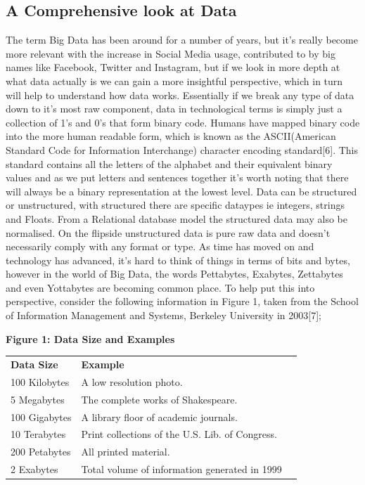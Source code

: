 \documentclass[10pt,journal,compsoc]{IEEEtran}
\begin{document}
\subsection{A Comprehensive look at Data}
The term Big Data has been around for a number of years, but it's really become more relevant with the increase in Social Media usage, contributed to by big names like Facebook, Twitter and Instagram, but if we look in more depth at what data actually is we can gain a more insightful perspective, which in turn will help to understand how data works. Essentially if we break any type of data down to it's most raw component, data in technological terms is simply just a collection of 1's and 0's that form binary code. Humans have mapped binary code into the more human readable form, which is known as the ASCII(American Standard Code for Information Interchange) character encoding standard[6]. This standard contains all the letters of the alphabet and their equivalent binary values and as we put letters and sentences together it's worth noting that there will always be a binary representation at the lowest level. Data can be structured or unstructured, with structured there are specific dataypes ie integers, strings and Floats. From a Relational database model the structured data may also be normalised. On the flipside unstructured data is pure raw data and doesn't necessarily comply with any format or type. As time has moved on and technology has advanced, it's hard to think of things in terms of bits and bytes, however in the world of Big Data, the words Pettabytes, Exabytes, Zettabytes and even Yottabytes are becoming common place. To help put this into perspective, consider the following information in Figure 1, taken from the School of Information Management and Systems, Berkeley University in 2003[7];\\

\begin{algoBox}{\textbf{Figure 1: Data Size and Examples}}
	\begin{tabular}{lp{}r}
		\bfseries Data Size & \bfseries Example &
		\bfseries  \\[1ex]
		100 Kilobytes & A low resolution photo. \\
		5 Megabytes & The complete works of Shakespeare. \\
		100 Gigabytes & A library floor of academic journals. \\
		10 Terabytes & Print collections of the U.S. Lib. of Congress. \\
		200 Petabytes & All printed material. \\
		2 Exabytes & Total volume of information generated in 1999
	\end{tabular}\\\\\\
\end{algoBox}
\end{document}
